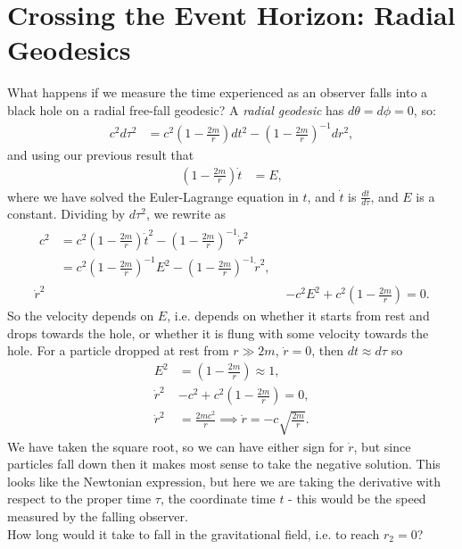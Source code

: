 \documentclass[a4paper, 11pt, normalem]{report}
\begin{document}
\section{Crossing the Event Horizon: Radial Geodesics}
What happens if we measure the time experienced as an observer falls into a black hole on a radial free-fall geodesic?
A \emph{radial geodesic} has $d\theta=d\phi=0$, so:
\begin{align}
    c^2d\tau^2 &= c^2\left(1-\frac{2m}{r}\right)dt^2 - \left(1-\frac{2m}{r}\right)^{-1}dr^2,
\end{align}
and using our previous result that 
\begin{align}
    \left(1-\frac{2m}{r}\right)\dot{t} &= E,
\end{align}
where we have solved the Euler-Lagrange equation in $t$, and $\dot{t}$ is $\frac{dt}{d\tau}$, and $E$ is a constant.
Dividing by $d\tau^2$, we rewrite as
\begin{align}
    \begin{split}
        c^2 &= c^2\left(1-\frac{2m}{r}\right)\dot{t}^2 - \left(1-\frac{2m}{r}\right)^{-1}\dot{r}^2\\
            &= c^2\left(1-\frac{2m}{r}\right)^{-1}E^2 - \left(1-\frac{2m}{r}\right)^{-1}\dot{r}^2,
    \end{split}\\
    \dot{r}^2 &- c^2E^2 + c^2\left(1-\frac{2m}{r}\right) = 0.
\end{align}
So the velocity depends on $E$, i.e. depends on whether it starts from rest and drops towards the hole, or whether it is flung with some velocity towards the hole. 
For a particle dropped at rest from $r\gg2m$, $\dot{r}=0$, then $dt\approx d\tau$ so
\begin{align}
    E^2 &= \left(1-\frac{2m}{r}\right) \approx 1, \\
    \dot{r}^2 &- c^2 + c^2\left(1-\frac{2m}{r}\right) = 0, \\
    \dot{r}^2 &= \frac{2mc^2}{r} \implies \dot{r} = -c\sqrt{\frac{2m}{r}}.
\end{align}
We have taken the square root, so we can have either sign for $\dot{r}$, but since particles fall down then it makes most sense to take the negative solution. 
This looks like the Newtonian expression, but here we are taking the derivative with respect to the proper time $\tau$,  the coordinate time $t$ - this would be the speed measured by the falling observer.\\
How long would it take to fall in the gravitational field, i.e. to reach $r_2=0$?
\end{document}
